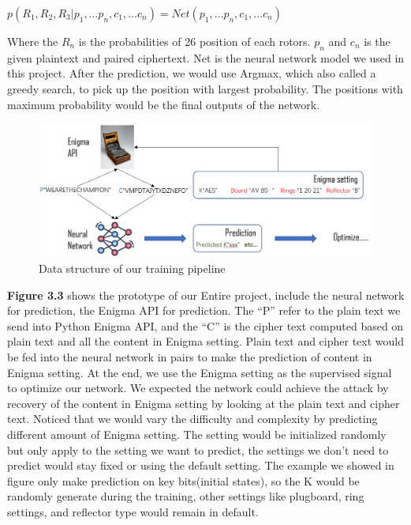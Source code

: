 \begin{center}
\(p(R_1,R_2,R_3 |p_1,…p_n,c_1,…c_n)=Net(p_1,…p_n,c_1,…c_n)\) 
\end{center}

Where the \(R_n\) is the probabilities of 26 position of each rotors. \(p_n\) and \(c_n\) is the given plaintext and paired ciphertext. Net is the neural network model we used in this project. After the prediction, we would use Argmax, which also called a greedy search, to pick up the position with largest probability. The positions with maximum probability would be the final outputs of the network.


\begin{figure}[hbt!]
    \centering
    \includegraphics[width=0.8\linewidth]{myReport//figures/prototype.png}
    \caption{Data structure of our training pipeline}
    \label{fig:enter-label}
\end{figure}


\textbf{Figure 3.3} shows the prototype of our Entire project, include the neural network for prediction, the Enigma API for prediction. The “P” refer to the plain text we send into Python Enigma API, and the “C” is the cipher text computed based on plain text and all the content in Enigma setting. Plain text and cipher text would be fed into the neural network in pairs to make the prediction of content in Enigma setting. At the end, we use the Enigma setting as the supervised signal to optimize our network. We expected the network could achieve the attack by recovery of the content in Enigma setting by looking at the plain text and cipher text. Noticed that we would vary the difficulty and complexity by predicting different amount of Enigma setting. The setting would be initialized randomly but only apply to the setting we want to predict, the settings we don't need to predict would stay fixed or using the default setting. The example we showed in figure only make prediction on key bits(initial states), so the K would be randomly generate during the training, other settings like plugboard, ring settings, and reflector type would remain in default. 

